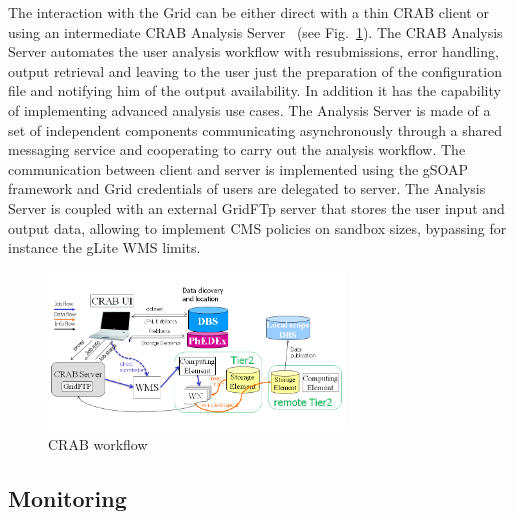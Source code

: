 
The interaction with the Grid can be either direct with a thin CRAB client or using an intermediate CRAB Analysis Server~\cite{RefCRAB} (see Fig.~\ref{fig:CRABWorkflow}). The CRAB Analysis Server automates the user analysis workflow with resubmissions, error handling, output retrieval and leaving to the user just the preparation of the configuration file and notifying him of the output availability. In addition it has the capability of implementing advanced analysis use cases.
The Analysis Server is made of a set of independent components communicating asynchronously through a shared messaging service and cooperating to carry out the analysis workflow. The communication between client and server is implemented using the gSOAP framework and Grid credentials of users are delegated to server.
The Analysis Server is coupled with an external GridFTp server %
 that stores the user input and output data, allowing to implement CMS policies on sandbox sizes, bypassing for instance the gLite WMS limits.


\begin{figure}
 \includegraphics[width=0.70\textwidth]{figures/CRABWorkflow.png}
\caption{CRAB workflow}
\label{fig:CRABWorkflow}
\end{figure}

\subsection{Monitoring}
\label{sec:3_3}
